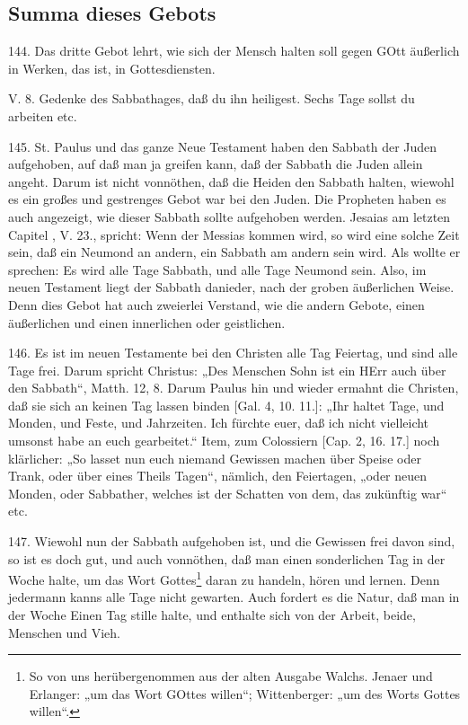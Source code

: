 \subsection{Summa dieses Gebots}

144. Das dritte Gebot lehrt, wie sich der Mensch halten soll gegen GOtt äußerlich in Werken, das ist, in Gottesdiensten.

\begin{schriftzitat}
V. 8. Gedenke des Sabbathages, daß du ihn heiligest. Sechs Tage sollst du arbeiten etc.
\end{schriftzitat}

145. St. Paulus und das ganze Neue Testament haben den Sabbath der Juden aufgehoben, auf daß man ja greifen kann, daß der Sabbath die Juden allein angeht. Darum ist nicht vonnöthen, daß die Heiden den Sabbath halten, wiewohl es ein großes und gestrenges Gebot war bei den Juden. Die Propheten haben es auch angezeigt, wie dieser Sabbath sollte aufgehoben werden. Jesaias am letzten Capitel
, V. 23., spricht: Wenn der Messias kommen wird, so wird eine solche Zeit sein, daß ein Neumond an andern, ein Sabbath am andern sein wird. Als wollte er sprechen: Es wird alle Tage Sabbath, und alle Tage Neumond sein. Also, im neuen Testament liegt der Sabbath danieder, nach der groben äußerlichen Weise. Denn dies Gebot hat auch zweierlei Verstand, wie die andern Gebote, einen äußerlichen und einen innerlichen oder geistlichen.

146. Es ist im neuen Testamente bei den Christen alle Tag Feiertag, und sind alle Tage frei. Darum spricht Christus: „Des Menschen Sohn ist ein HErr auch über den Sabbath“, Matth. 12, 8. Darum Paulus hin und wieder ermahnt die Christen, daß sie sich an keinen Tag lassen binden [Gal. 4, 10. 11.]: „Ihr haltet Tage, und Monden, und Feste, und Jahrzeiten. Ich fürchte euer, daß ich nicht vielleicht umsonst habe an euch gearbeitet.“ Item, zum Colossiern [Cap. 2, 16. 17.] noch klärlicher: „So lasset nun euch niemand Gewissen machen über Speise oder Trank, oder über eines Theils Tagen“, nämlich, den Feiertagen, „oder neuen Monden, oder Sabbather, welches ist der Schatten von dem, das zukünftig war“ etc.

147. Wiewohl nun der Sabbath aufgehoben ist, und die Gewissen frei davon sind, so ist es doch gut, und auch vonnöthen, daß man einen sonderlichen Tag in der Woche halte, um das Wort Gottes\footnote{So von uns herübergenommen aus der alten Ausgabe Walchs. Jenaer und Erlanger: „um das Wort GOttes willen“; Wittenberger: „um des Worts Gottes willen“.} daran zu handeln, hören und lernen. Denn jedermann kanns alle Tage nicht gewarten. Auch fordert es die Natur, daß man in der Woche Einen Tag stille halte, und enthalte sich von der Arbeit, beide, Menschen und Vieh.

